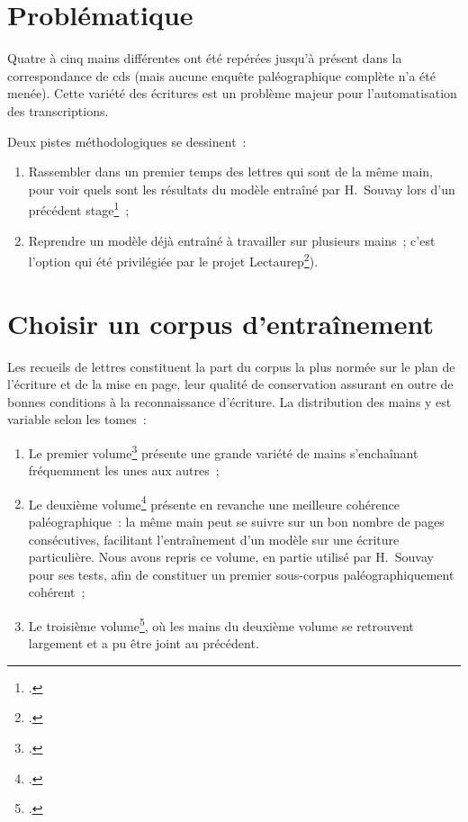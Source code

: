 \documentclass[a4paper,12pt,twoside]{book}
\begin{document}
		\section{Problématique}
		Quatre à cinq mains différentes ont été repérées jusqu'à présent dans la correspondance de \gls{cds} (mais aucune enquête paléographique complète n'a été menée). Cette variété des écritures est un problème majeur pour l'automatisation des transcriptions.
		
		Deux pistes méthodologiques se dessinent~:
		\begin{enumerate}
			\item Rassembler dans un premier temps des lettres qui sont de la même main, pour voir quels sont les résultats du modèle entraîné par H.~Souvay lors d'un précédent stage\footcite{souvayCorrespondanceConstanceSalm2021}~;
			\item Reprendre un modèle déjà entraîné à travailler sur plusieurs mains~; c'est l'option qui été privilégiée par le projet Lectaurep\footcite{chagueCreationModelesTranscriptiona}).
		\end{enumerate}
				
		\section{Choisir un corpus d'entraînement}
			Les recueils de lettres constituent la part du corpus la plus normée sur le plan de l'écriture et de la mise en page, leur qualité de conservation assurant en outre de bonnes conditions à la reconnaissance d'écriture. La distribution des mains y est variable selon les tomes :
		\begin{enumerate}
			\item Le premier volume\footcite{salmCorrespondanceGeneraleSecondea} présente une grande variété de mains s'enchaînant fréquemment les unes aux autres~;
			\item Le deuxième volume\footcite{salmCorrespondanceGeneraleSeconde}  présente en revanche une meilleure cohérence paléographique : la même main peut se suivre sur un bon nombre de pages consécutives, facilitant l'entraînement d'un modèle sur une écriture particulière. Nous avons repris ce volume, en partie utilisé par H. Souvay pour ses tests, afin de constituer un premier sous-corpus paléographiquement cohérent~;
			\item Le troisième volume\footcite{salmCorrespondanceGeneraleSecondeb}, où les mains du deuxième volume se retrouvent largement et a pu être joint au précédent.
		\end{enumerate}
	
\end{document}
